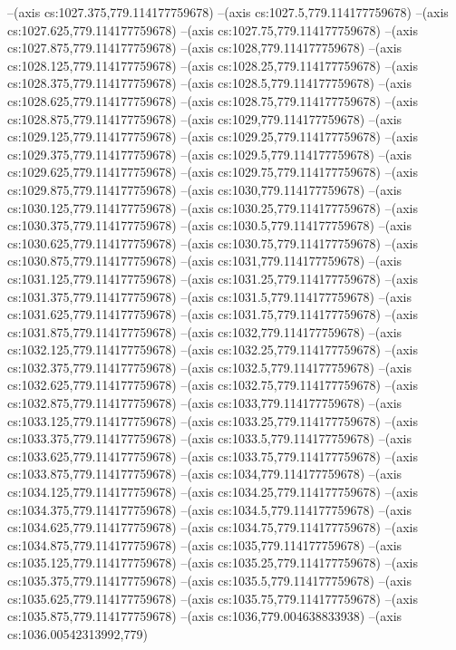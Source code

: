 --(axis cs:1027.375,779.114177759678)
--(axis cs:1027.5,779.114177759678)
--(axis cs:1027.625,779.114177759678)
--(axis cs:1027.75,779.114177759678)
--(axis cs:1027.875,779.114177759678)
--(axis cs:1028,779.114177759678)
--(axis cs:1028.125,779.114177759678)
--(axis cs:1028.25,779.114177759678)
--(axis cs:1028.375,779.114177759678)
--(axis cs:1028.5,779.114177759678)
--(axis cs:1028.625,779.114177759678)
--(axis cs:1028.75,779.114177759678)
--(axis cs:1028.875,779.114177759678)
--(axis cs:1029,779.114177759678)
--(axis cs:1029.125,779.114177759678)
--(axis cs:1029.25,779.114177759678)
--(axis cs:1029.375,779.114177759678)
--(axis cs:1029.5,779.114177759678)
--(axis cs:1029.625,779.114177759678)
--(axis cs:1029.75,779.114177759678)
--(axis cs:1029.875,779.114177759678)
--(axis cs:1030,779.114177759678)
--(axis cs:1030.125,779.114177759678)
--(axis cs:1030.25,779.114177759678)
--(axis cs:1030.375,779.114177759678)
--(axis cs:1030.5,779.114177759678)
--(axis cs:1030.625,779.114177759678)
--(axis cs:1030.75,779.114177759678)
--(axis cs:1030.875,779.114177759678)
--(axis cs:1031,779.114177759678)
--(axis cs:1031.125,779.114177759678)
--(axis cs:1031.25,779.114177759678)
--(axis cs:1031.375,779.114177759678)
--(axis cs:1031.5,779.114177759678)
--(axis cs:1031.625,779.114177759678)
--(axis cs:1031.75,779.114177759678)
--(axis cs:1031.875,779.114177759678)
--(axis cs:1032,779.114177759678)
--(axis cs:1032.125,779.114177759678)
--(axis cs:1032.25,779.114177759678)
--(axis cs:1032.375,779.114177759678)
--(axis cs:1032.5,779.114177759678)
--(axis cs:1032.625,779.114177759678)
--(axis cs:1032.75,779.114177759678)
--(axis cs:1032.875,779.114177759678)
--(axis cs:1033,779.114177759678)
--(axis cs:1033.125,779.114177759678)
--(axis cs:1033.25,779.114177759678)
--(axis cs:1033.375,779.114177759678)
--(axis cs:1033.5,779.114177759678)
--(axis cs:1033.625,779.114177759678)
--(axis cs:1033.75,779.114177759678)
--(axis cs:1033.875,779.114177759678)
--(axis cs:1034,779.114177759678)
--(axis cs:1034.125,779.114177759678)
--(axis cs:1034.25,779.114177759678)
--(axis cs:1034.375,779.114177759678)
--(axis cs:1034.5,779.114177759678)
--(axis cs:1034.625,779.114177759678)
--(axis cs:1034.75,779.114177759678)
--(axis cs:1034.875,779.114177759678)
--(axis cs:1035,779.114177759678)
--(axis cs:1035.125,779.114177759678)
--(axis cs:1035.25,779.114177759678)
--(axis cs:1035.375,779.114177759678)
--(axis cs:1035.5,779.114177759678)
--(axis cs:1035.625,779.114177759678)
--(axis cs:1035.75,779.114177759678)
--(axis cs:1035.875,779.114177759678)
--(axis cs:1036,779.004638833938)
--(axis cs:1036.00542313992,779)
